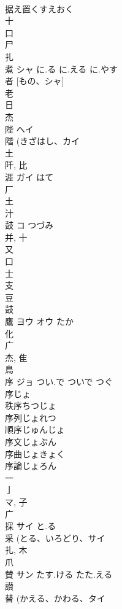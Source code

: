 \documentclass[8pt]{extreport}
\begin{document}
\begin{CJK}{UTF8}{min}
\\	据え置くすえおく
\\	十 
\\	口 
\\	尸 
\\	扎	
\\	煮	シャ	に.る に.える に.やす	
\\	者 [もの、シャ] 
\\	老 
\\	日 
\\	杰	
\\	陛	ヘイ		
\\	階 (きざはし、カイ 
\\	土 
\\	阡, 比 
\\	涯	ガイ	はて	
\\	厂 
\\	土 
\\	汁 
\\	鼓	コ	つづみ	
\\	并, 十 
\\	又 
\\	口 
\\	士 
\\	支 
\\	豆 
\\	鼓 
\\	鷹	ヨウ オウ	たか	
\\	化 
\\	广 
\\	杰, 隹 
\\	鳥 
\\	序	ジョ	つい.で ついで つぐ	
\\	序じょ
\\	秩序ちつじょ
\\	序列じょれつ
\\	順序じゅんじょ
\\	序文じょぶん
\\	序曲じょきょく
\\	序論じょろん
\\	一 
\\	亅 
\\	マ, 子 
\\	广 
\\	採	サイ	と.る	
\\	采 (とる、いろどり、サイ 
\\	扎, 木 
\\	爪 
\\	賛	サン	たす.ける たた.える	
\\	讃 
\\	替 (かえる、かわる、タイ 

\end{CJK}
\end{document}
